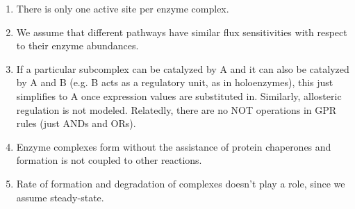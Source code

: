 

\begin{enumerate}
 {} \label{asm:mm}
Fluxes in general strive to operate near the $V_{max}$ of the
reaction, which is proportional to enzyme complex abundance.
 {} \label{asm:expcorr}
Expression values are highly correlated with the copy numbers of their
corresponding peptide isoforms.
 {}  \label{asm:isozyme} 
Protein isoforms contributing to isozymes are considered part of the
same enzyme complex.
 {} \label{asm:hierarchy}
Any enzyme complex can be described as a hierarchical subset of
(possibly redundant) subcomplexes; redundant subcomplexes, as
elaborated in (\ref{asm:nostoich}), are not currently modeled.
 {} \label{asm:nostoich} 
Assume one copy of peptide per complex; exact isoform stoichiometry
is not considered.
 {} \label{asm:sharing} 
With the exception of complexes having identical rules (i.e. the same
complex listed for different reactions), each copy of a peptide
is available for all complexes in the model.
\item \label{asm:active_site}
There is only one active site per enzyme complex.
\item \label{asm:enzyme_sensitivity} 
We assume that different pathways have similar flux sensitivities
with respect to their enzyme abundances.
\item  \label{asm:holo} 
If a particular subcomplex can be catalyzed by A and it can also be
catalyzed by A and B (e.g. B acts as a regulatory unit, as in
holoenzymes), this just simplifies to A once expression values are
substituted in. Similarly, allosteric regulation is not
modeled. Relatedly, there are no NOT operations in GPR rules (just ANDs
and ORs).
\item \label{asm:chap} 
Enzyme complexes form without the assistance of protein chaperones and
formation is not coupled to other reactions.  
\item \label{asm:rate} 
Rate of formation and degradation of complexes doesn't play a role,
since we assume steady-state. 
\end{enumerate}

